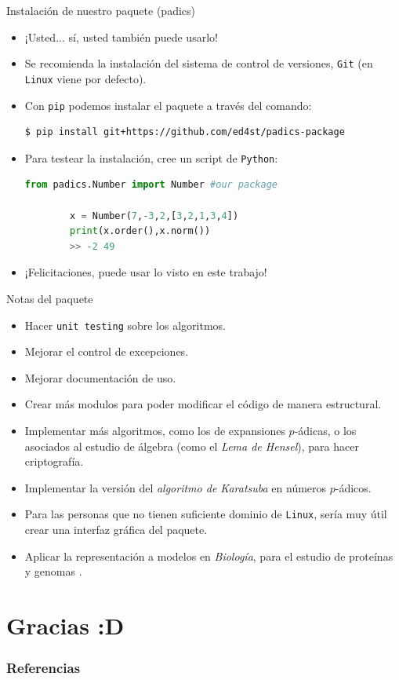 \documentclass{beamer}
\theoremstyle{definition}
\numberwithin{equation}{section}
\newcommand{\tit}[1]{\textit{#1}}
\begin{document}
\begin{frame}[fragile]{Instalación de nuestro paquete (padics)}
	\begin{itemize}[<+- | alert@+>]
		\item ¡Usted... sí, usted también puede usarlo!
		\item Se recomienda la instalación del sistema de control de versiones, \texttt{Git} (en \texttt{Linux} viene por defecto).
		\item Con \texttt{pip} podemos instalar el paquete a través del comando:
		\begin{lstlisting}[caption=Terminal o símbolo del sistema,basicstyle=\tiny]
		$ pip install git+https://github.com/ed4st/padics-package	
		\end{lstlisting}
		\item Para testear la instalación, cree un script de \texttt{Python}:
		\begin{lstlisting}[language = Python, caption = test del paquete, basicstyle=\tiny]
		from padics.Number import Number #our package
		
		x = Number(7,-3,2,[3,2,1,3,4])
		print(x.order(),x.norm())
		>> -2 49
		\end{lstlisting}
		\item ¡Felicitaciones, puede usar lo visto en este trabajo!
	\end{itemize}
\end{frame}


\begin{frame}{Notas del paquete}
	\begin{itemize}[<+- | alert@+>]
		\item Hacer \texttt{unit testing} sobre los algoritmos.
		\item Mejorar el control de excepciones.
		\item Mejorar documentación de uso.
		\item Crear más modulos para poder modificar el código de manera estructural.
		\item Implementar más algoritmos, como los de expansiones $p$-ádicas, o los asociados al estudio de álgebra (como el \textit{Lema de Hensel}), para hacer criptografía.
		\item Implementar la versión del \textit{algoritmo de Karatsuba} en números $p$-ádicos.
		\item Para las personas que no tienen suficiente dominio de \texttt{Linux}, sería muy útil crear una interfaz gráfica del paquete.
		\item Aplicar la representación a modelos en \tit{Biología}, para el estudio de proteínas y genomas \cite{A-B-O}.
	\end{itemize}
\end{frame}

\section*{Gracias :D}







\begin{frame}[allowframebreaks]
	\frametitle{Referencias} 
	\nocite{*} 
	 
	 
\end{frame}
\end{document}
